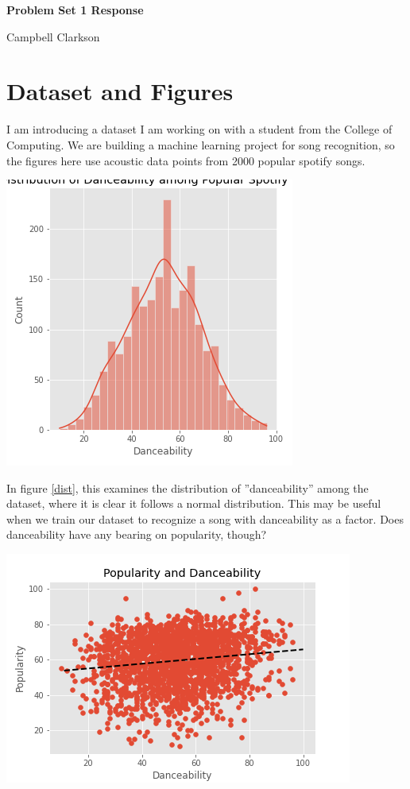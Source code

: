 \documentclass[11pt]{article}
\begin{document}
	\newpage
	\begin{center}
		\textbf{Problem Set 1 Response} 
		
		Campbell Clarkson
	\end{center}
	
	\section{Dataset and Figures}\label{section1}
	
	\noindent I am introducing a dataset I am working on with a student from the College of Computing. We are building a machine learning project for song recognition, so the figures here use acoustic data points from 2000 popular spotify songs.
	
	\begin{center}
	\includegraphics[scale=1]{dance_hist}\label{dist}
	\end{center}
	
	In figure \ref{dist}, this examines the distribution of ''danceability'' among the dataset, where it is clear it follows a normal distribution. This may be useful when we train our dataset to recognize a song with danceability as a factor. Does danceability have any bearing on popularity, though? 
	
	\begin{center}
		\includegraphics[scale=1]{dance_pop_scatter}\label{scat_dance}
	\end{center}
\end{document}
